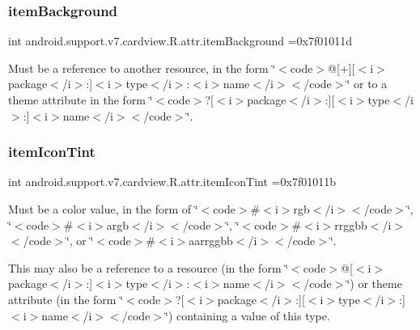\subsubsection{\texorpdfstring{item\+Background}{itemBackground}}
{\footnotesize\ttfamily int android.\+support.\+v7.\+cardview.\+R.\+attr.\+item\+Background =0x7f01011d\hspace{0.3cm}{\ttfamily [static]}}

Must be a reference to another resource, in the form \char`\"{}$<$code$>$@\mbox{[}+\mbox{]}\mbox{[}$<$i$>$package$<$/i$>$\+:\mbox{]}$<$i$>$type$<$/i$>$\+:$<$i$>$name$<$/i$>$$<$/code$>$\char`\"{} or to a theme attribute in the form \char`\"{}$<$code$>$?\mbox{[}$<$i$>$package$<$/i$>$\+:\mbox{]}\mbox{[}$<$i$>$type$<$/i$>$\+:\mbox{]}$<$i$>$name$<$/i$>$$<$/code$>$\char`\"{}. \mbox{\label{classandroid_1_1support_1_1v7_1_1cardview_1_1R_1_1attr_a1a956cf2559faa64461061b13883f806}} 
\subsubsection{\texorpdfstring{item\+Icon\+Tint}{itemIconTint}}
{\footnotesize\ttfamily int android.\+support.\+v7.\+cardview.\+R.\+attr.\+item\+Icon\+Tint =0x7f01011b\hspace{0.3cm}{\ttfamily [static]}}

Must be a color value, in the form of \char`\"{}$<$code$>$\#$<$i$>$rgb$<$/i$>$$<$/code$>$\char`\"{}, \char`\"{}$<$code$>$\#$<$i$>$argb$<$/i$>$$<$/code$>$\char`\"{}, \char`\"{}$<$code$>$\#$<$i$>$rrggbb$<$/i$>$$<$/code$>$\char`\"{}, or \char`\"{}$<$code$>$\#$<$i$>$aarrggbb$<$/i$>$$<$/code$>$\char`\"{}. 

This may also be a reference to a resource (in the form \char`\"{}$<$code$>$@\mbox{[}$<$i$>$package$<$/i$>$\+:\mbox{]}$<$i$>$type$<$/i$>$\+:$<$i$>$name$<$/i$>$$<$/code$>$\char`\"{}) or theme attribute (in the form \char`\"{}$<$code$>$?\mbox{[}$<$i$>$package$<$/i$>$\+:\mbox{]}\mbox{[}$<$i$>$type$<$/i$>$\+:\mbox{]}$<$i$>$name$<$/i$>$$<$/code$>$\char`\"{}) containing a value of this type. \mbox{\label{classandroid_1_1support_1_1v7_1_1cardview_1_1R_1_1attr_a0d99f47cfd454bbcb9277b6e3440c206}} 
